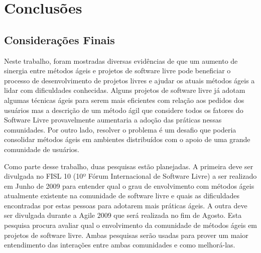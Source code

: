 \chapter{Conclusões}
\label{cap:conclusoes}

\section{Considerações Finais}

Neste trabalho, foram mostradas diversas evidências de que um aumento
de sinergia entre métodos ágeis e projetos de software livre pode
beneficiar o processo de desenvolvimento de projetos livres e ajudar
os atuais métodos ágeis a lidar com dificuldades conhecidas. Alguns
projetos de software livre já adotam algumas técnicas ágeis para serem
mais eficientes com relação aos pedidos dos usuários mas a descrição
de um método ágil que considere todos os fatores do Software Livre
provavelmente aumentaria a adoção das práticas nessas comunidades. Por
outro lado, resolver o problema é um desafio que poderia consolidar
métodos ágeis em ambientes distribuídos com o apoio de uma grande
comunidade de usuários.

Como parte desse trabalho, duas pesquisas estão planejadas. A primeira
deve ser divulgada no FISL 10 (10º Fórum Internacional de Software
Livre) a ser realizado em Junho de 2009 para entender qual o grau de
envolvimento com métodos ágeis atualmente existente na comunidade de
software livre e quais as dificuldades encontradas por estas pessoas
para adotarem mais práticas ágeis. A outra deve ser divulgada durante
a Agile 2009 que será realizada no fim de Agosto. Esta pesquisa
procura avaliar qual o envolvimento da comunidade de métodos ágeis em
projetos de software livre. Ambas pesquisas serão usadas para prover
um maior entendimento das interações entre ambas comunidades e como
melhorá-las.


